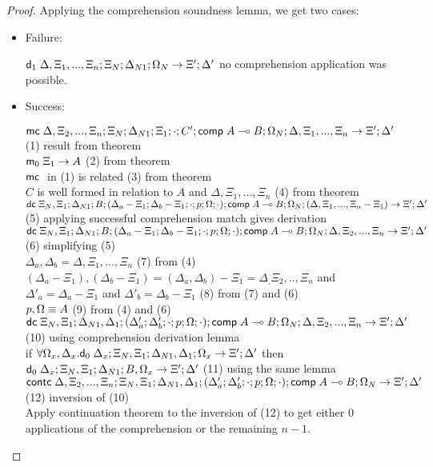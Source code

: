 \begin{proof}
   Applying the comprehension soundness lemma, we get two cases:
   
   \begin{itemize}
      \item Failure:
      
      $\mathsf{d}_1 \; \Delta, \Xi_1, ..., \Xi_n; \Xi_N; \Delta_{N1}; \Omega_N \rightarrow \Xi'; \Delta'$ \hfill no comprehension application was possible.
      
      \item Success:
      
      $\mathsf{mc} \; \Delta, \Xi_2, ..., \Xi_n; \Xi_N; \Delta_{N1}; \Xi_1; \cdot; C'; \mathsf{comp} \; A \multimap B; \Omega_N; \Delta, \Xi_1, ..., \Xi_n \rightarrow \Xi'; \Delta'$ \hfill (1) result from theorem \\
      $\mathsf{m}_0 \; \Xi_1 \rightarrow A$ \hfill (2) from theorem \\
      $\mathsf{mc} \;$ in (1) is related \hfill (3) from theorem \\
      $C$ is well formed in relation to $A$ and $\Delta, \Xi_1, ..., \Xi_n$ \hfill (4) from theorem \\
      
      $\mathsf{dc} \; \Xi_N, \Xi_1; \Delta_{N1}; B; (\Delta_a - \Xi_1; \Delta_b - \Xi_1; \cdot; p; \Omega; \cdot); \mathsf{comp} \; A \multimap B; \Omega_N; (\Delta, \Xi_1, ..., \Xi_n - \Xi_1) \rightarrow \Xi'; \Delta'$ \hfill (5) applying successful comprehension match gives derivation \\
      $\mathsf{dc} \; \Xi_N, \Xi_1; \Delta_{N1}; B; (\Delta_a - \Xi_1; \Delta_b - \Xi_1; \cdot; p; \Omega; \cdot); \mathsf{comp} \; A \multimap B; \Omega_N; \Delta, \Xi_2, ..., \Xi_n \rightarrow \Xi'; \Delta'$ \hfill (6) simplifying (5) \\
      $\Delta_a, \Delta_b = \Delta, \Xi_1, ..., \Xi_n$ \hfill (7) from (4) \\
      $(\Delta_a - \Xi_1), (\Delta_b - \Xi_1) = (\Delta_a, \Delta_b) - \Xi_1 = \Delta_, \Xi_2, .., \Xi_n$ and $\Delta'_a = \Delta_a - \Xi_1$ and $\Delta'_b = \Delta_b - \Xi_1$ \hfill (8) from (7) and (6) \\
      $p, \Omega \equiv A$ \hfill (9) from (4) and (6) \\
      $\mathsf{dc} \; \Xi_N, \Xi_1; \Delta_{N1}, \Delta_1; (\Delta'_a; \Delta'_b; \cdot; p; \Omega; \cdot); \mathsf{comp} \; A \multimap B; \Omega_N; \Delta, \Xi_2, ..., \Xi_n \rightarrow \Xi'; \Delta'$ \hfill (10) using comprehension derivation lemma \\
      if $\forall \Omega_x, \Delta_x. \mathsf{d}_0 \; \Delta_x; \Xi_N, \Xi_1; \Delta_{N1}, \Delta_1; \Omega_x \rightarrow \Xi'; \Delta'$ then $\mathsf{d}_0 \; \Delta_x; \Xi_N, \Xi_1; \Delta_{N1}; B, \Omega_x \rightarrow \Xi'; \Delta'$ \hfill (11) using the same lemma \\ 
      $\mathsf{contc} \; \Delta, \Xi_2, ..., \Xi_n; \Xi_N, \Xi_1; \Delta_{N1}, \Delta_1; (\Delta'_a; \Delta'_b; \cdot; p; \Omega; \cdot); \mathsf{comp} \; A \multimap B; \Omega_N \rightarrow \Xi'; \Delta'$ \hfill (12) inversion of (10) \\
      Apply continuation theorem to the inversion of (12) to get either $0$ applications of the comprehension or the remaining $n-1$.
   \end{itemize}
\end{proof}

